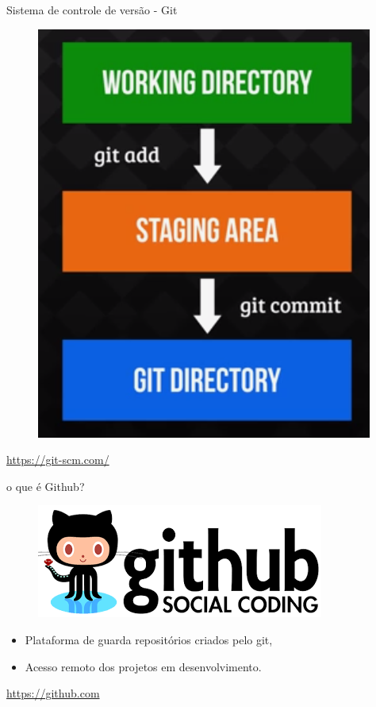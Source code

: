 \documentclass[12pt]{beamer}
\begin{document}

\begin{frame}{Sistema de controle de versão - Git}

	\begin{figure}[!htb]
		\centering
		\includegraphics[scale=0.45]{figuras/fig5.png} 
		\label{fig:fig1} %
	\end{figure}
	\centering \url{https://git-scm.com/}
\end{frame}


\begin{frame}{o que é Github?}
	\begin{figure}[!htb]
    	\centering
		\includegraphics[scale=0.5]{figuras/github.png} 
	\end{figure}
	\begin{itemize}
		\item Plataforma de guarda repositórios criados pelo git,
		\item Acesso remoto dos projetos em desenvolvimento.
	\end{itemize}
	\centering \url{https://github.com}
	
\end{frame}
\end{document}

